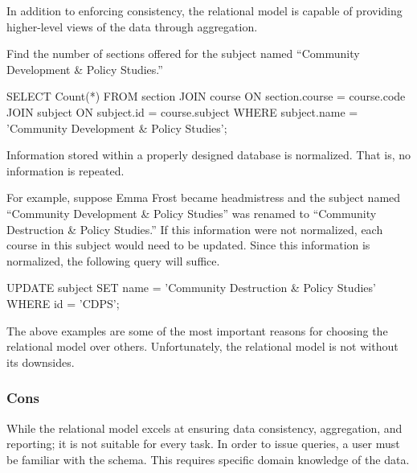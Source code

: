 			In addition to enforcing consistency, the relational model is capable of providing higher-level views of the data through aggregation.
			
			\begin{ex}[Aggregation]
				Find the number of sections offered for the subject named ``Community Development \& Policy Studies.''
				
				\begin{singlespaced}
					\begin{sqlcode}
SELECT Count(*)
FROM   section
       JOIN course
         ON section.course = course.code
       JOIN subject
         ON subject.id = course.subject
WHERE  subject.name = 'Community Development & Policy Studies';
					\end{sqlcode}
				\end{singlespaced}
			\end{ex}
			
			Information stored within a properly designed database is normalized.  That is, no information is repeated.
			
			\begin{ex}[Normalization]
				For example, suppose Emma Frost became headmistress and the subject named ``Community Development \& Policy Studies'' was renamed to ``Community Destruction \& Policy Studies.''  If this information were not normalized, each course in this subject would need to be updated.  Since this information is normalized, the following query will suffice.
				
				\begin{singlespaced}
					\begin{sqlcode}
UPDATE subject
SET    name = 'Community Destruction & Policy Studies'
WHERE  id = 'CDPS';
					\end{sqlcode}
				\end{singlespaced}
			\end{ex}
			
			The above examples are some of the most important reasons for choosing the relational model over others.	Unfortunately, the relational model is not without its downsides.
		
		\subsubsection{Cons}
			While the relational model excels at ensuring data consistency, aggregation, and reporting; it is not suitable for every task.	In order to issue queries, a user must be familiar with the schema.	 This requires specific domain knowledge of the data.
			

